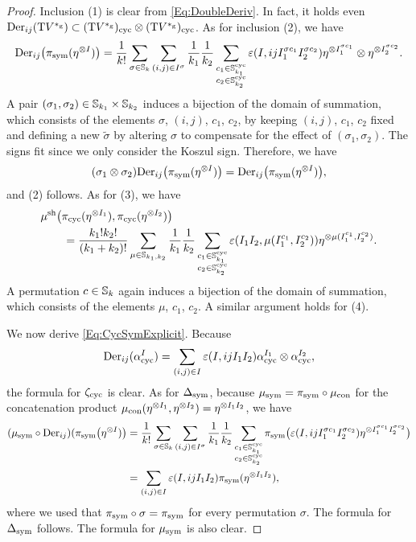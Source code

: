 \documentclass[\MainFolder/Text.tex]{subfiles}
\begin{document}
\begin{proof}
Inclusion (1) is clear from \eqref{Eq:DoubleDeriv}. In fact, it holds even $\mathrm{Der}_{ij}(\mathrm{T} V^{*_{\mathrm{g}}}) \subset  (\mathrm{T} V^{*_{\mathrm{g}}})_{\mathrm{cyc}} \otimes (\mathrm{T} V^{*_{\mathrm{g}}})_{\mathrm{cyc}}$. As for inclusion (2), we have
$$ \mathrm{Der}_{ij}\bigl(\pi_{\mathrm{sym}}(\eta^{\otimes I})\bigr) = \frac{1}{k!}\sum_{\sigma\in \mathbb{S}_k}\sum_{(i,j)\in I^\sigma}\frac{1}{k_1}\frac{1}{k_2}\sum_{\substack{c_1\in\mathbb{S}^{\mathrm{cyc}}_{k_1}\\c_2\in\mathbb{S}^{\mathrm{cyc}}_{k_2}}}\varepsilon(I,i j I_1^{\sigma c_1}I_2^{\sigma c_2})\eta^{\otimes I_1^{\sigma c_1}}\otimes\eta^{\otimes I_2^{\sigma c_2}}. $$
A pair $(\sigma_1,\sigma_2)\in\mathbb{S}_{k_1}\times\mathbb{S}_{k_2}$ induces a bijection of the domain of summation, which consists of the elements $\sigma$, $(i,j)$, $c_1$, $c_2$, by keeping $(i,j)$, $c_1$, $c_2$ fixed and defining a new $\tilde{\sigma}$ by altering $\sigma$ to compensate for the effect of $(\sigma_1, \sigma_2)$. The signs fit since we only consider the Koszul sign. Therefore, we have
$$ (\sigma_1\otimes \sigma_2)\mathrm{Der}_{ij}\bigl(\pi_{\mathrm{sym}}(\eta^{\otimes I})\bigr) = \mathrm{Der}_{ij}\bigl(\pi_{\mathrm{sym}}(\eta^{\otimes I})\bigr), $$
and (2) follows. As for (3), we have
\begin{align*}
& \mu^{\mathrm{sh}}\bigl(\pi_{\mathrm{cyc}}(\eta^{\otimes I_1}),\pi_{\mathrm{cyc}}(\eta^{\otimes I_2})\bigr)\\
&\qquad=\frac{k_1!k_2!}{(k_1+k_2)!}  \sum_{\mu\in\mathbb{S}_{k_1,k_2}} \frac{1}{k_1}\frac{1}{k_2} \sum_{\substack{c_1\in \mathbb{S}^{\mathrm{cyc}}_{k_1}\\ c_2\in\mathbb{S}^{\mathrm{cyc}}_{k_2}}} \varepsilon(I_1 I_2,\mu(I_1^{c_1},I_2^{c_2})) \eta^{\otimes \mu(I_1^{c_1},I_2^{c_2})}.
\end{align*}
A permutation $c\in \mathbb{S}_k$ again induces a bijection of the domain of summation, which consists of the elements $\mu$, $c_1$, $c_2$. A similar argument holds for (4).

We now derive \eqref{Eq:CycSymExplicit}. Because
$$ \mathrm{Der}_{ij}(\alpha^I_{\mathrm{cyc}}) = \sum_{(i,j)\in I} \varepsilon(I,ijI_1I_2) \alpha^{I_1}_{\mathrm{cyc}}\otimes\alpha^{I_2}_{\mathrm{cyc}}, $$
the formula for $\zeta_{\mathrm{cyc}}$ is clear. As for $\operatorname{\Delta}_{\mathrm{sym}}$, because $\mu_{\mathrm{sym}} = \pi_{\mathrm{sym}} \circ \mu_{\mathrm{con}}$ for the concatenation product $\mu_{\mathrm{con}}(\eta^{\otimes I_1},\eta^{\otimes I_2}) = \eta^{\otimes I_1 I_2}$, we have
\begin{align*}
(\mu_{\mathrm{sym}}\circ \mathrm{Der}_{ij})(\pi_{\mathrm{sym}}\bigl(\eta^{\otimes I})\bigr) & = \frac{1}{k!}\sum_{\sigma\in \mathbb{S}_k}\sum_{(i,j)\in I^\sigma}\frac{1}{k_1}\frac{1}{k_2}\sum_{\substack{c_1\in\mathbb{S}^{\mathrm{cyc}}_{k_1}\\c_2\in\mathbb{S}^{\mathrm{cyc}}_{k_2}}}\pi_{\mathrm{sym}}\bigl(\varepsilon(I,i j I_1^{\sigma c_1}I_2^{\sigma c_2})\eta^{\otimes I_1^{\sigma c_1}I_2^{\sigma c_2}}\bigr) \\
& = \sum_{(i,j)\in I} \varepsilon(I,ijI_1 I_2) \pi_{\mathrm{sym}}(\eta^{\otimes I_1 I_2}),
\end{align*}
where we used that $\pi_{\mathrm{sym}} \circ \sigma = \pi_{\mathrm{sym}}$ for every permutation $\sigma$. The formula for $\operatorname{\Delta}_{\mathrm{sym}}$ follows. The formula for $\mu_{\mathrm{sym}}$ is also clear.
\end{proof}
\end{document}
